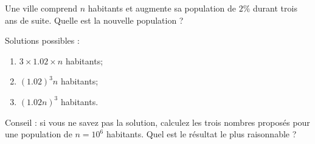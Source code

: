 
\begin{exercice}\label{exoPremiere-0017}

        Une ville comprend \( n\) habitants et augmente sa population de \( 2\%\) durant trois ans de suite. Quelle est la nouvelle population ?

        Solutions possibles :
        \begin{enumerate}
            \item
                \( 3\times 1.02\times n\) habitants;
            \item
                \( (1.02)^3n\) habitants;
            \item
                \( (1.02n)^3\) habitants.
        \end{enumerate}
        Conseil : si vous ne savez pas la solution, calculez les trois nombres proposés pour une population de \( n=10^6\) habitants. Quel est le résultat le plus raisonnable ?

\end{exercice}

